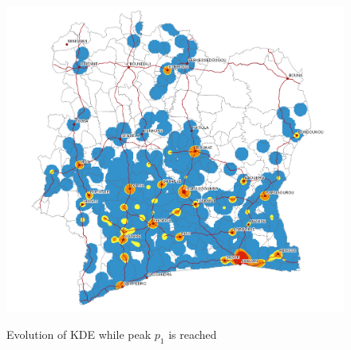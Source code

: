 \begin{figure}
{    \includegraphics[scale = 0.3]{results/images/kernel/l_hour18_kd.pdf}
	\label{fig:subfig1}
}
\caption[KDE evolution while peak $p_1$ is reached]{Evolution of KDE while peak $p_1$ is reached}
\label{fig:subfigureExample}
\end{figure}







